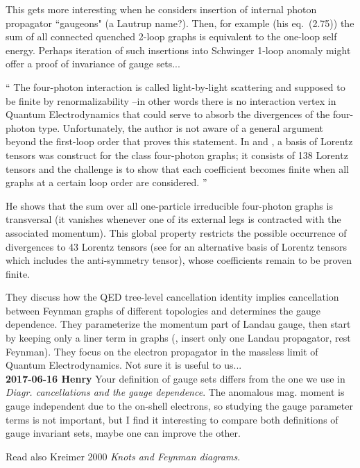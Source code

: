 \begin{description}
This gets more interesting when he considers insertion of internal
photon propagator ``gaugeons" (a Lautrup name?). Then, for example
(his eq.~(2.75)) the sum of all connected quenched 2-loop graphs
is equivalent to the one-loop self energy. Perhaps iteration of
such insertions into Schwinger 1-loop anomaly might offer a proof
of invariance of gauge sets...

``
The four-photon interaction is called light-by-light scattering and
supposed to be finite by renormalizability --in other words there is no
interaction vertex in Quantum Electrodynamics that could serve to absorb
the divergences of the four-photon type. Unfortunately, the author is not
aware of a general argument beyond the first-loop order that proves this
statement. In  and , a basis of
Lorentz tensors was construct for the class four-photon graphs; it
consists of 138 Lorentz tensors and the challenge is to show that each
coefficient becomes finite when all graphs at a certain loop order are
considered.
''

He  shows that the sum over all one-particle irreducible four-photon
graphs is transversal (it vanishes whenever one of its external legs is
contracted with the associated momentum). This global property restricts
the possible occurrence of divergences to 43 Lorentz tensors (see
 for an alternative basis of Lorentz tensors which
includes the anti-symmetry tensor), whose coefficients remain to be
proven finite.

They discuss how the QED tree-level cancellation identity implies
cancellation between Feynman graphs of different topologies and
determines the gauge dependence. They parameterize the momentum part of
Landau gauge, then start by keeping only a liner term in graphs (\ie,
insert only one Landau propagator, rest Feynman).
They focus on the electron propagator in the massless limit of Quantum
Electrodynamics.
Not sure it is useful
to us...
\\{\bf 2017-06-16 Henry}
Your definition of gauge sets
differs from the one we use in {\em Diagr. cancellations and
the gauge dependence}. The anomalous mag. moment is gauge
independent due to the on-shell electrons, so studying the gauge
parameter terms is not important, but I find it interesting to compare
both definitions of gauge invariant sets, maybe one can improve the other.

Read also Kreimer 2000
{\em Knots and {Feynman} diagrams}.


\end{description}

